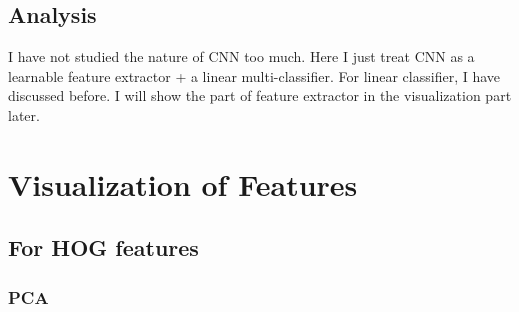 \documentclass{article}
\begin{document}
\subsection{Analysis}
I have not studied the nature of CNN too much. Here I just treat CNN as a learnable feature extractor + a linear multi-classifier. For linear classifier, I have discussed before. I will show the part of feature extractor in the visualization part later.
\section{Visualization of Features}
\subsection{For HOG features}
\subsubsection{PCA}
\end{document}
